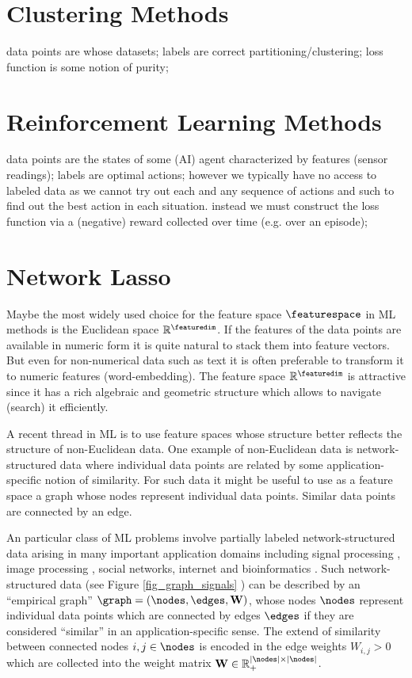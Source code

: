 \documentclass[12pt]{report}
\begin{document}
\section{Clustering Methods} 
\label{sec_clustering_methods} 
data points are whose datasets; labels are correct partitioning/clustering; loss function is some notion of purity; 


\section{Reinforcement Learning Methods}
\label{sec_reinflearning_methods}
data points are the states of some (AI) agent characterized by features (sensor readings); 
labels are optimal actions; however we typically have no access to labeled 
data as we cannot try out each and any sequence of actions and such to 
find out the best action in each situation. instead we must construct the 
loss function via a (negative) reward collected over time (e.g. over an episode); 

 
\section{Network Lasso} 
\label{sec_network_lasso}

Maybe the most widely used choice for the feature space $\featurespace$ in 
ML methods is the Euclidean space $\mathbb{R}^{\featuredim}$. If the features 
of the data points are available in numeric form it is quite natural to stack them 
into feature vectors. But even for non-numerical data such as text it is often 
preferable to transform it to numeric features (word-embedding). The feature 
space $\mathbb{R}^{\featuredim}$ is attractive since it has a rich algebraic and 
geometric structure which allows to navigate (search) it efficiently. 

A recent thread in ML is to use feature spaces whose structure better 
reflects the structure of non-Euclidean data. One example of non-Euclidean 
data is network-structured data where individual data points are related 
by some application-specific notion of similarity. For such data it might be useful 
to use as a feature space a graph whose nodes represent individual data points. 
Similar data points are connected by an edge. 


An particular class of ML problems involve partially labeled network-structured data arising in many 
important application domains including signal processing \cite{ChenVarma,Chen2015}, image 
processing \cite{LempKohli2009,ShiMalik2000}, social networks, internet and bioinformatics 
\cite{NewmannBook,SemiSupervisedBook,Fergus2009}. Such network-structured data 
(see Figure \ref{fig_graph_signals} ) can be described by an ``empirical graph'' $\graph=(\nodes,\edges,\mathbf{W})$,  
whose nodes $\nodes$ represent individual data points which are connected by edges $\edges$ 
if they are considered ``similar'' in an application-specific sense. The extend of similarity between 
connected nodes $i,j \in \nodes$ is encoded in the edge weights $W_{i,j} > 0$ which are collected 
into the weight matrix $\mathbf{W} \in \mathbb{R}_{+}^{|\nodes| \times |\nodes|}$.  
\end{document}
